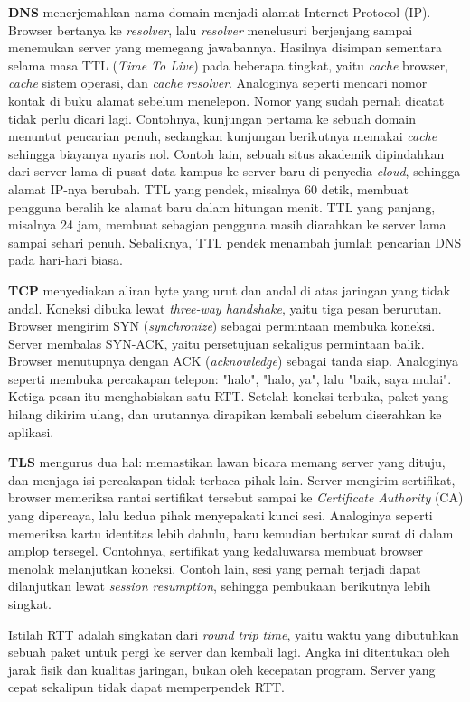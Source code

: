 \textbf{DNS} menerjemahkan nama domain menjadi alamat Internet Protocol
(IP).
Browser bertanya ke \textit{resolver}, lalu \textit{resolver} menelusuri
berjenjang sampai menemukan server yang memegang jawabannya. Hasilnya disimpan
sementara selama masa TTL (\textit{Time To Live}) pada beberapa tingkat, yaitu
\textit{cache} browser, \textit{cache} sistem operasi, dan \textit{cache}
\textit{resolver}. Analoginya seperti mencari nomor kontak di buku alamat
sebelum menelepon. Nomor yang sudah pernah dicatat tidak perlu dicari lagi.
Contohnya, kunjungan pertama ke sebuah domain menuntut pencarian penuh,
sedangkan kunjungan berikutnya memakai \textit{cache} sehingga biayanya nyaris
nol. Contoh lain, sebuah situs akademik dipindahkan dari server lama di pusat
data kampus ke server baru di penyedia \textit{cloud}, sehingga alamat IP-nya
berubah. TTL yang pendek, misalnya 60 detik, membuat pengguna beralih ke alamat
baru dalam hitungan menit. TTL yang panjang, misalnya 24 jam, membuat sebagian
pengguna masih diarahkan ke server lama sampai sehari penuh. Sebaliknya, TTL
pendek menambah jumlah pencarian DNS pada hari-hari biasa.

\textbf{TCP} menyediakan aliran byte yang urut dan andal di atas jaringan yang
tidak andal. Koneksi dibuka lewat \textit{three-way handshake}, yaitu tiga
pesan berurutan. Browser mengirim SYN (\textit{synchronize}) sebagai permintaan
membuka koneksi. Server membalas SYN-ACK, yaitu persetujuan sekaligus
permintaan balik. Browser menutupnya dengan ACK (\textit{acknowledge}) sebagai
tanda siap. Analoginya seperti membuka percakapan telepon: "halo", "halo, ya",
lalu "baik, saya mulai". Ketiga pesan itu menghabiskan satu RTT. Setelah
koneksi terbuka, paket yang hilang dikirim ulang, dan urutannya dirapikan
kembali sebelum diserahkan ke aplikasi.

\textbf{TLS} mengurus dua hal: memastikan lawan bicara memang server yang
dituju, dan menjaga isi percakapan tidak terbaca pihak lain. Server mengirim
sertifikat, browser memeriksa rantai sertifikat tersebut sampai ke
\textit{Certificate Authority} (CA) yang dipercaya, lalu kedua pihak menyepakati
kunci sesi. Analoginya seperti memeriksa kartu identitas lebih dahulu, baru
kemudian bertukar surat di dalam amplop tersegel. Contohnya, sertifikat yang
kedaluwarsa membuat browser menolak melanjutkan koneksi. Contoh lain, sesi yang
pernah terjadi dapat dilanjutkan lewat \textit{session resumption}, sehingga
pembukaan berikutnya lebih singkat.

Istilah RTT adalah singkatan dari \textit{round trip time}, yaitu waktu yang
dibutuhkan sebuah paket untuk pergi ke server dan kembali lagi. Angka ini
ditentukan oleh jarak fisik dan kualitas jaringan, bukan oleh kecepatan
program. Server yang cepat sekalipun tidak dapat memperpendek RTT.

